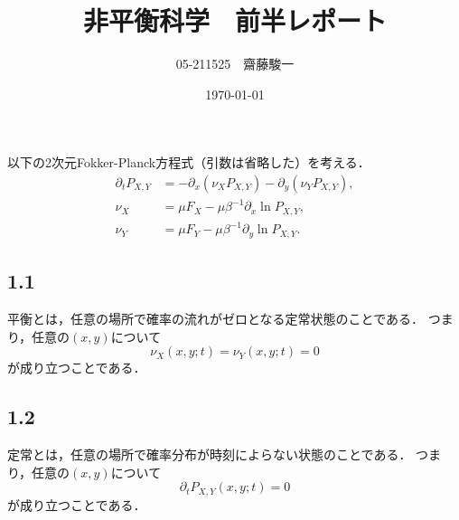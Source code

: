 \documentclass[a4paper,11pt]{jsarticle}
\begin{document}
\title{非平衡科学　前半レポート}
\author{05-211525　齋藤駿一}
\date{\today}
\maketitle

\section{}
以下の2次元Fokker-Planck方程式（引数は省略した）を考える．
\begin{align}
  \partial_t P_{X,Y} &= -\partial_x \left(\nu_X P_{X,Y}\right) - \partial_y \left(\nu_Y P_{X,Y}\right), \label{Pt}\\
  \nu_X &= \mu F_X - \mu \beta^{-1} \partial_x \ln{P_{X,Y}}, \label{nX}\\
  \nu_Y &= \mu F_Y - \mu \beta^{-1} \partial_y \ln{P_{X,Y}}. \label{nY}
\end{align}

\subsection*{1.1}
平衡とは，任意の場所で確率の流れがゼロとなる定常状態のことである．
つまり，任意の$(x,y)$について
\begin{equation}
  \nu_X(x,y;t) = \nu_Y(x,y;t) = 0 \label{eq}
\end{equation}
が成り立つことである．

\subsection*{1.2}
定常とは，任意の場所で確率分布が時刻によらない状態のことである．
つまり，任意の$(x,y)$について
\begin{equation}
  \partial_t P_{X,Y}(x,y;t) = 0 \label{st}
\end{equation}
が成り立つことである．
\end{document}
